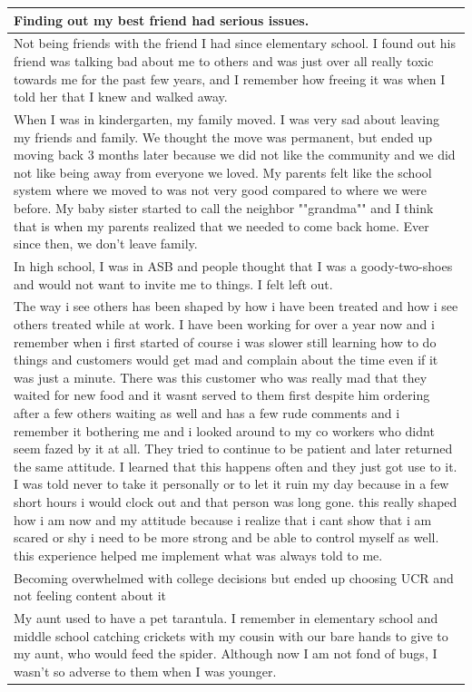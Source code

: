 \documentclass[
  .7em,
  letterpaper,
  DIV=11,
  numbers=noendperiod]{scrartcl}
\begin{document}
\begin{table}
\begin{tabular}{l}
\hline
Finding out my best friend had serious issues.\\
\hline
Not being friends with the friend I had since elementary school. I found out his friend was talking bad about me to others and was just over all really toxic towards me for the past few years, and I remember how freeing it was when I told her that I knew and walked away.\\
\hline
When I was in kindergarten, my family moved. I was very sad about leaving my friends and family. We thought the move was permanent, but ended up moving back 3 months later because we did not like the community and we did not like being away from everyone we loved. My parents felt like the school system where we moved to was not very good compared to where we were before. My baby sister started to call the neighbor ""grandma"" and I think that is when my parents realized that we needed to come back home. Ever since then, we don't leave family.\\
\hline
In high school, I was in ASB and people thought that I was a goody-two-shoes and would not want to invite me to things. I felt left out.\\
\hline
The way i see others has been shaped by how i have been treated and how i see others treated while at work. I have been working for over a year now and i remember when i first started of course i was slower still learning how to do things and customers would get mad and complain about the time even if it was just a minute. There was this customer who was really mad that they waited for new food and it wasnt served to them first despite him ordering after a few others waiting as well and has a few rude comments and i remember it bothering me and i looked around to my co workers who didnt seem fazed by it at all. They tried to continue to be patient and later returned the same attitude. I learned that this happens often and they just got use to it. I was told never to take it personally or to let it ruin my day because in a few short hours i would clock out and that person was long gone. this really shaped how i am now and my attitude because i realize that i cant show that i am scared or shy i need to be more strong and be able to control myself as well. this experience helped me implement what was always told to me.\\
\hline
Becoming overwhelmed with college decisions but ended up choosing UCR and not feeling content about it\\
\hline
My aunt used to have a pet tarantula. I remember in elementary school and middle school catching crickets with my cousin with our bare hands to give to my aunt, who would feed the spider. Although now I am not fond of bugs, I wasn’t so adverse to them when I was younger.\\

\end{tabular}
\end{table}
\end{document}
